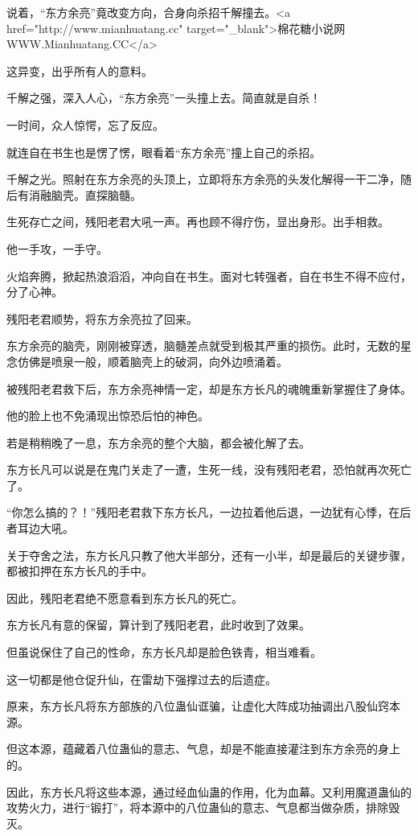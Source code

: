 \begin{this_body}
说着，“东方余亮”竟改变方向，合身向杀招千解撞去。<a href="http://www.mianhuatang.cc" target="\_blank">棉花糖小说网WWW.Mianhuatang.CC</a>

这异变，出乎所有人的意料。

千解之强，深入人心，“东方余亮”一头撞上去。简直就是自杀！

一时间，众人惊愕，忘了反应。

就连自在书生也是愣了愣，眼看着“东方余亮”撞上自己的杀招。

千解之光。照射在东方余亮的头顶上，立即将东方余亮的头发化解得一干二净，随后有消融脑壳。直探脑髓。

生死存亡之间，残阳老君大吼一声。再也顾不得疗伤，显出身形。出手相救。

他一手攻，一手守。

火焰奔腾，掀起热浪滔滔，冲向自在书生。面对七转强者，自在书生不得不应付，分了心神。

残阳老君顺势，将东方余亮拉了回来。

东方余亮的脑壳，刚刚被穿透，脑髓差点就受到极其严重的损伤。此时，无数的星念仿佛是喷泉一般，顺着脑壳上的破洞，向外边喷涌着。

被残阳老君救下后，东方余亮神情一定，却是东方长凡的魂魄重新掌握住了身体。

他的脸上也不免涌现出惊恐后怕的神色。

若是稍稍晚了一息，东方余亮的整个大脑，都会被化解了去。

东方长凡可以说是在鬼门关走了一遭，生死一线，没有残阳老君，恐怕就再次死亡了。

“你怎么搞的？！”残阳老君救下东方长凡，一边拉着他后退，一边犹有心悸，在后者耳边大吼。

关于夺舍之法，东方长凡只教了他大半部分，还有一小半，却是最后的关键步骤，都被扣押在东方长凡的手中。

因此，残阳老君绝不愿意看到东方长凡的死亡。

东方长凡有意的保留，算计到了残阳老君，此时收到了效果。

但虽说保住了自己的性命，东方长凡却是脸色铁青，相当难看。

这一切都是他仓促升仙，在雷劫下强撑过去的后遗症。

原来，东方长凡将东方部族的八位蛊仙诓骗，让虚化大阵成功抽调出八股仙窍本源。

但这本源，蕴藏着八位蛊仙的意志、气息，却是不能直接灌注到东方余亮的身上的。

因此，东方长凡将这些本源，通过经血仙蛊的作用，化为血幕。又利用魔道蛊仙的攻势火力，进行“锻打”，将本源中的八位蛊仙的意志、气息都当做杂质，排除毁灭。


\end{this_body}
